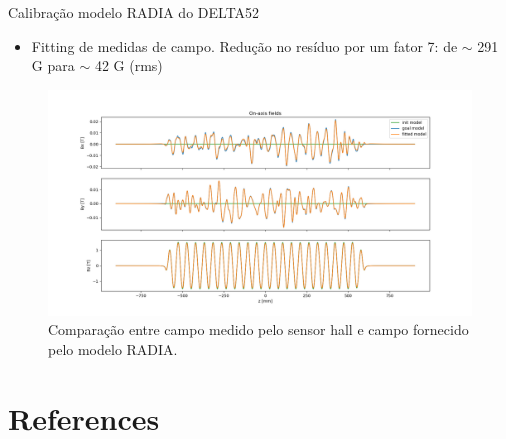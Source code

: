 \documentclass{beamer}					%
\begin{document}
\begin{frame}{Calibração modelo RADIA do DELTA52}
\begin{itemize}
        \item Fitting de medidas de campo. Redução no resíduo por um fator 7: de $\sim$ 291 G para $\sim$ 42 G (rms)
	\end{itemize}
\begin{figure}[H]
		\centering
        \includegraphics[width=.9\textwidth]{figures/field_fitting.png}
        \caption{Comparação entre campo medido pelo sensor hall e campo fornecido pelo modelo RADIA.}
        \label{fig:field_fitting}
    \end{figure}
\end{frame}


\section{References}

% 	
\end{document}
